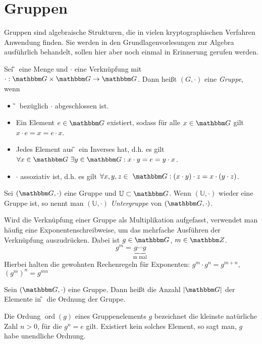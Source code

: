 
\chapter{Gruppen}
Gruppen sind algebraische Strukturen, die in vielen kryptographischen
Verfahren Anwendung finden. Sie werden in den Grundlagenvorlesungen zur
Algebra ausführlich behandelt, sollen hier aber noch einmal in
Erinnerung gerufen werden.

\begin{definition}[Gruppe]
Sei \G~eine Menge und $\cdot$ eine Verknüpfung mit $\cdot: \G\times \G \to
\G$. Dann heißt $(G, \cdot)$ eine \textit{Gruppe}, wenn
\begin{itemize}
\item \G~bezüglich $\cdot$ abgeschlossen ist.
\item Ein Element $e \in \G$ existiert, sodass für alle $x \in \G$ gilt
  $x\cdot e=x=e\cdot x$.
\item Jedes Element aus \G~ein Inverses hat, d.h. es gilt $\forall x \in
  \G~ \exists y \in \G: x\cdot y=e=y\cdot x$.
\item $\cdot$ assoziativ ist,  d.h. es gilt $\forall x, y, z  \in ~\G:
  (x\cdot y)\cdot z = x\cdot(y \cdot z)$.
\end{itemize}
\end{definition}
\begin{definition}[Untergruppe]
  Sei $(\G, \cdot)$ eine Gruppe und $\mathbb{U} \subset \G$. Wenn
  $(\mathbb{U}, \cdot)$ wieder eine Gruppe ist, so nennt man $(\mathbb{U},
  \cdot)$ \textit{Untergruppe} von $(\G, \cdot)$.
\end{definition}

\begin{definition}
Wird die Verknüpfung einer Gruppe als Multiplikation aufgefasst,
verwendet man häufig eine Exponentenschreibweise, um das mehrfache
Ausführen der Verknüpfung auszudrücken. Dabei ist $g\in \G$, $m \in \Z{}$.
\[ g^m = \underbrace{g\cdots g}_{\text{m mal}} \]
Hierbei halten die gewohnten Rechenregeln für Exponenten: $g^m\cdot g^n =
g^{m+n}$, $(g^m)^n = g^{mn}$
\end{definition}


\begin{definition}
  Sein $(\G, \cdot)$ eine Gruppe. Dann heißt die Anzahl $|\G|$ der Elemente in
  \G~die Ordnung der Gruppe.
\end{definition}

\begin{definition}
  Die Ordung $\operatorname{ord}(g) $ eines Gruppenelements $g$
  bezeichnet die kleinste 
  natürliche Zahl $n>0$, für die $g^n = e$ gilt. Existiert kein solches
  Element, so sagt man, $g$ habe unendliche Ordnung.
 \end{definition}

